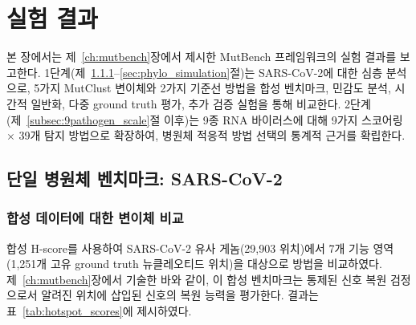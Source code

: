 \chapter{실험 결과}
\label{ch:results}

본 장에서는 제~\ref{ch:mutbench}장에서 제시한 MutBench 프레임워크의 실험 결과를 보고한다.
1단계(제~\ref{sec:variant_comparison}--\ref{sec:phylo_simulation}절)는 SARS-CoV-2에 대한 심층 분석으로, 5가지 MutClust 변이체와 2가지 기준선 방법을 합성 벤치마크, 민감도 분석, 시간적 일반화, 다중 ground truth 평가, 추가 검증 실험을 통해 비교한다.
2단계(제~\ref{subsec:9pathogen_scale}절 이후)는 9종 RNA 바이러스에 대해 9가지 스코어링 $\times$ 39개 탐지 방법으로 확장하여, 병원체 적응적 방법 선택의 통계적 근거를 확립한다.


\section{단일 병원체 벤치마크: SARS-CoV-2}
\label{sec:single_pathogen_benchmark}

\subsection{합성 데이터에 대한 변이체 비교}
\label{sec:variant_comparison}


합성 H-score를 사용하여 SARS-CoV-2 유사 게놈(29,903 위치)에서 7개 기능 영역(1,251개 고유 ground truth 뉴클레오티드 위치)을 대상으로 방법을 비교하였다.
제~\ref{ch:mutbench}장에서 기술한 바와 같이, 이 합성 벤치마크는 통제된 신호 복원 검정으로서 알려진 위치에 삽입된 신호의 복원 능력을 평가한다.
결과는 표~\ref{tab:hotspot_scores}에 제시하였다.

